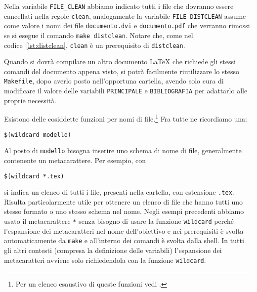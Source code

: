 Nella variabile \texttt{FILE\_CLEAN} abbiamo indicato tutti i file che dovranno
essere cancellati nella regole \texttt{clean}, analogamente la variabile
\texttt{FILE\_DISTCLEAN} assume come valore i nomi dei file
\texttt{documento.dvi} e \texttt{documento.pdf} che verranno rimossi se si
esegue il comando \texttt{make distclean}.  Notare che, come nel
codice~\ref{lst:distclean}, \texttt{clean} è un prerequisito di
\texttt{distclean}.

Quando si dovrà compilare un altro documento \LaTeX{}
che richiede gli stessi comandi del documento appena visto, si potrà facilmente
riutilizzare lo stesso \texttt{Makefile}, dopo averlo posto nell'opportuna
cartella, avendo solo cura di modificare il valore delle variabili
\texttt{PRINCIPALE} e \texttt{BIBLIOGRAFIA} per adattarlo alle proprie
necessità.

Esistono delle cosiddette funzioni per nomi di
file.\footnote{Per un elenco esaustivo di queste funzioni vedi
  \textcite[83]{gnu:make}.} Fra tutte ne ricordiamo una:
\begin{lstlisting}
$(wildcard modello)
\end{lstlisting}
Al posto di \texttt{modello} bisogna inserire uno schema di nome di file,
generalmente contenente un metacarattere. Per esempio, con
\begin{lstlisting}
$(wildcard *.tex)
\end{lstlisting}
si indica un elenco di tutti i file, presenti nella cartella, con estensione
\texttt{.tex}.  Risulta particolarmente utile per ottenere un elenco di file che
hanno tutti uno stesso formato o uno stesso schema nel nome.  Negli esempi
precedenti abbiamo usato il metacarattere \texttt{*} senza bisogno di usare la
funzione \texttt{wildcard} perché l'espansione dei metacaratteri nel nome
dell'obiettivo e nei prerequisiti è svolta automaticamente da \texttt{make} e
all'interno dei comandi è svolta dalla shell.  In tutti gli altri contesti
(compresa la definizione delle variabili) l'espansione dei metacaratteri avviene
solo richiedendola con la funzione \texttt{wildcard}.

